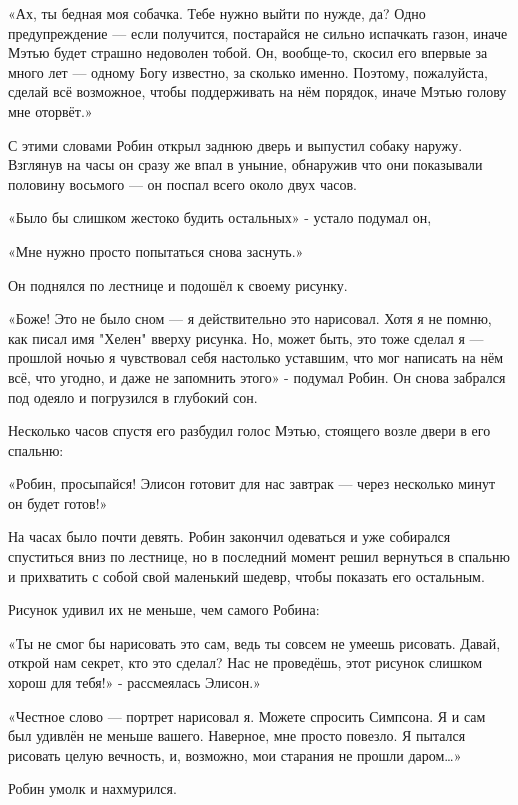 \documentclass[a4paper,12pt]{book}
\begin{document}
\par
«Ах, ты бедная моя собачка. Тебе нужно выйти по нужде, да? Одно предупреждение — если получится, постарайся не сильно испачкать газон, иначе Мэтью будет страшно недоволен тобой. Он, вообще-то, скосил его впервые за много лет — одному Богу известно, за сколько именно. Поэтому, пожалуйста, сделай всё возможное, чтобы поддерживать на нём порядок, иначе Мэтью голову мне оторвёт.»
\par
С этими словами Робин открыл заднюю дверь и выпустил собаку наружу. Взглянув на часы он сразу же впал в уныние, обнаружив что они показывали половину восьмого — он поспал всего около двух часов.
\par
«Было бы слишком жестоко будить остальных» - устало подумал он,
\par
«Мне нужно просто попытаться снова заснуть.»
\par
Он поднялся по лестнице и подошёл к своему рисунку.
\par
«Боже! Это не было сном — я действительно это нарисовал. Хотя я не помню, как писал имя "Хелен" вверху рисунка. Но, может быть, это тоже сделал я — прошлой ночью я чувствовал себя настолько уставшим, что мог написать на нём всё, что угодно, и даже не запомнить этого» - подумал Робин. Он снова забрался под одеяло и погрузился в глубокий сон.\\
\par
Несколько часов спустя его разбудил голос Мэтью, стоящего возле двери в его спальню:
\par
«Робин, просыпайся! Элисон готовит для нас завтрак — через несколько минут он будет готов!»
\par
На часах было почти девять. Робин закончил одеваться и уже собирался спуститься вниз по лестнице, но в последний момент решил вернуться в спальню и прихватить с собой свой маленький шедевр, чтобы показать его остальным.
\par
Рисунок удивил их не меньше, чем самого Робина:
\par
«Ты не смог бы нарисовать это сам, ведь ты совсем не умеешь рисовать. Давай, открой нам секрет, кто это сделал? Нас не проведёшь, этот рисунок слишком хорош для тебя!» - рассмеялась Элисон.»
\par
«Честное слово — портрет нарисовал я. Можете спросить Симпсона. Я и сам был удивлён не меньше вашего. Наверное, мне просто повезло. Я пытался рисовать целую вечность, и, возможно, мои старания не прошли даром…»
\par
Робин умолк и нахмурился.
\par
\end{document}
